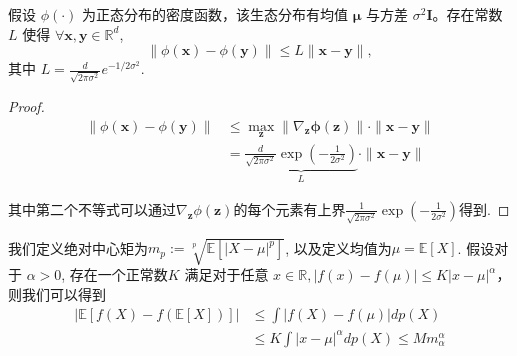 \begin{lemma}
\label{lemma 3}
     假设 $\phi(\cdot)$ 为正态分布的密度函数，该生态分布有均值   $\boldsymbol{\mu}$ 与方差 $\sigma^2 \boldsymbol{I}$。存在常数$L$ 使得 $\forall \boldsymbol{x}, \boldsymbol{y} \in \mathbb{R}^d$,
\begin{equation}
    \|\phi(\boldsymbol{x})-\phi(\boldsymbol{y})\| \leq L\|\boldsymbol{x}-\boldsymbol{y}\|,
    \label{Lipschitz condition}
\end{equation}
其中 $L=\frac{d}{\sqrt{2 \pi \sigma^2}} e^{-1 / 2 \sigma^2}$.
\end{lemma}
\begin{proof}
    \begin{align}
\|\phi(\boldsymbol{x})-\phi(\boldsymbol{y})\| & \leq \max _{\boldsymbol{z}}\left\|\nabla_{\boldsymbol{z}} \boldsymbol{\phi}(\boldsymbol{z})\right\| \cdot\|\boldsymbol{x}-\boldsymbol{y}\| \\
& =\underbrace{\frac{d}{\sqrt{2 \pi \sigma^2}} \exp \left(-\frac{1}{2 \sigma^2}\right)}_L \cdot\|\boldsymbol{x}-\boldsymbol{y}\|
\end{align}

其中第二个不等式可以通过$\nabla_{\boldsymbol{z}} \phi(\boldsymbol{z})$的每个元素有上界$\frac{1}{\sqrt{2 \pi \sigma^2}} \exp \left(-\frac{1}{2 \sigma^2}\right)$得到.
\end{proof}


\begin{proposition}[Jesen误差上界估计]
\label{proposition 2 }

     我们定义绝对中心矩为$m_p:=\sqrt[p]{\mathbb{E}\left[|X-\mu|^p\right]}$, 以及定义均值为$\mu=\mathbb{E}[X]$. 假设对于 $\alpha>0$, 存在一个正常数$K$ 满足对于任意 $x \in \mathbb{R},|f(x)-f(\mu)| \leq K|x-\mu|^\alpha$，则我们可以得到
\begin{align}
|\mathbb{E}[f(X)-f(\mathbb{E}[X])]| & \leq \int|f(X)-f(\mu)| d p(X) \\
& \leq K \int|x-\mu|^\alpha d p(X) \leq M m_\alpha^\alpha
\end{align}
\end{proposition}

